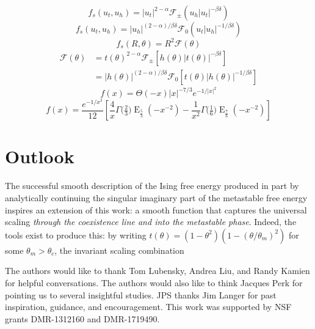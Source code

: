 \documentclass[
  aps,
  prb,
  reprint,
  longbibliography,
  floatfix
]{revtex4-2}
\begin{document}
\begin{equation} \label{eq:free.energy.3d.low}
  f_s(u_t, u_h)
  = |u_t|^{2-\alpha}\mathcal F_{\pm}(u_h|u_t|^{-\beta\delta})
\end{equation}
\begin{equation} \label{eq:free.energy.3d.mid}
  f_s(u_t, u_h)
  = |u_h|^{(2-\alpha)/\beta\delta}\mathcal F_0(u_t|u_h|^{-1/\beta\delta})
\end{equation}
\begin{equation} \label{eq:schofield.3d.free.energy}
  f_s(R, \theta) = R^2\mathcal F(\theta)
\end{equation}
\begin{equation} \label{eq:scaling.function.equivalences.3d}
  \begin{aligned}
    \mathcal F(\theta)
    &=t(\theta)^{2-\alpha}\mathcal F_\pm\left[h(\theta)|t(\theta)|^{-\beta\delta}\right] \\
    &=|h(\theta)|^{(2-\alpha)/\beta\delta}\mathcal F_0\left[t(\theta)|h(\theta)|^{-1/\beta\delta}\right]
  \end{aligned}
\end{equation}
\begin{equation} \label{eq:im.f.func.3d}
  f(x)=\Theta(-x) |x|^{-7/3} e^{-1/|x|^2}
\end{equation}
\begin{equation}
  f(x)=\frac{e^{-1/x^2}}{12}\left[
    \frac4x\Gamma\big(\tfrac23\big)\operatorname{E}_{\frac53}(-x^{-2})
    -\frac1{x^2}\Gamma\big(\tfrac16\big)\operatorname{E}_{\frac76}(-x^{-2})
  \right]
\end{equation}

\section{Outlook}

The successful smooth description of the Ising free energy produced in part by analytically continuing the singular imaginary part of the metastable free energy inspires an extension of this work: a smooth function that captures the universal scaling \emph{through the coexistence line and into the metastable phase}. Indeed, the tools exist to produce this: by writing $t(\theta)=(1-\theta^2)(1-(\theta/\theta_m)^2)$ for some $\theta_m>\theta_c$, the invariant scaling combination

\begin{acknowledgments}
  The authors would like to thank Tom Lubensky, Andrea Liu, and Randy Kamien
  for helpful conversations. The authors would also like to think Jacques Perk
  for pointing us to several insightful studies. JPS thanks Jim Langer for past
  inspiration, guidance, and encouragement. This work was supported by NSF
  grants DMR-1312160 and DMR-1719490.
\end{acknowledgments}


\end{document}
